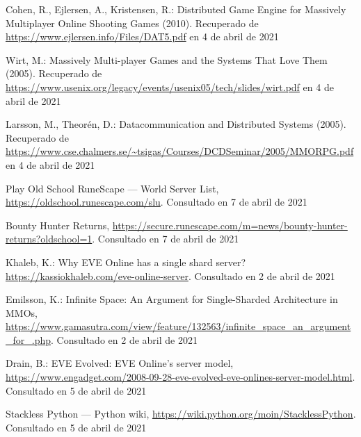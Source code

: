 \documentclass[runningheads]{llncs}
\begin{document}
\begin{thebibliography}{8}
	Cohen, R., Ejlersen, A., Kristensen, R.: Distributed Game Engine for Massively Multiplayer Online Shooting Games (2010). Recuperado de \url{https://www.ejlersen.info/Files/DAT5.pdf} en 4 de abril de 2021

	Wirt, M.: Massively Multi-player Games and the Systems That Love Them (2005). Recuperado de \url{https://www.usenix.org/legacy/events/usenix05/tech/slides/wirt.pdf} en 4 de abril de 2021

	Larsson, M., Theorén, D.: Datacommunication and Distributed Systems (2005). Recuperado de \url{https://www.cse.chalmers.se/~tsigas/Courses/DCDSeminar/2005/MMORPG.pdf} en 4 de abril de 2021

	Play Old School RuneScape --- World Server List, \url{https://oldschool.runescape.com/slu}. Consultado en 7 de abril de 2021

	Bounty Hunter Returns, \url{https://secure.runescape.com/m=news/bounty-hunter-returns?oldschool=1}. Consultado en 7 de abril de 2021

	Khaleb, K.: Why EVE Online has a single shard server? \url{https://kassiokhaleb.com/eve-online-server}. Consultado en 2 de abril de 2021

	Emilsson, K.: Infinite Space: An Argument for Single-Sharded Architecture in MMOs, \url{https://www.gamasutra.com/view/feature/132563/infinite\_space\_an\_argument\_for\_.php}. Consultado en 2 de abril de 2021

	Drain, B.: EVE Evolved: EVE Online's server model, \url{https://www.engadget.com/2008-09-28-eve-evolved-eve-onlines-server-model.html}. Consultado en 5 de abril de 2021

	Stackless Python --- Python wiki, \url{https://wiki.python.org/moin/StacklessPython}. Consultado en 5 de abril de 2021
\end{thebibliography}
\end{document}
